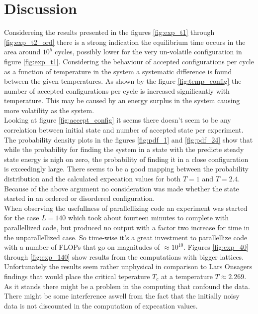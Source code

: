 \documentclass[12pt]{article}
\begin{document}
\section{Discussion}

Considereing the results presented in the figures \ref{fig:exp_t1} through \ref{fig:exp_t2_ord} there is a strong indication the  equilibrium time occurs in the area around $10^5$ cycles, possibly lower for the very un-volatile configuration in figure \ref{fig:exp_t1}. Considering the behaviour of accepted configurations per cycle as a function of temperature in the system a systematic difference is found between the given temperatures. As shown by the figure \ref{fig:temp_config} the number of accepted configurations per cycle is increased significantly with temperature. This may be caused by an energy surplus in the  system causing more volatility as the system. \\
 
\noindent Looking at figure \ref{fig:accept_config} it seems there doesn't seem to be any correlation between initial state and number of accepted state per experiment. \\

\noindent The probability density plots in the figures \ref{fig:pdf_1} and \ref{fig:pdf_24} show that while the probability for finding the system in a state with the predicte steady state energy is nigh on zero, the probability of finding it in a close configuration is exceedingly large. There seems to be a good mapping between the probability distribution and the calculated expecation values for both $T=1$ and $T = 2.4$. Because of the above argument no consideration was made whether the  state started in an ordered or disordered configuration.\\

\noindent When observing the usefullness of parallellizing code an experiment was started for the case $L = 140$ which took about fourteen minutes to complete with parallellized code, but produced no output with a factor two increase for time in the unparallellized case. So time-wise it's a great investment to parallellize code with a number of FLOPs that go on magnitudes of $\approx 10^{10}$. Figures \ref{fig:exp_40} through \ref{fig:exp_140} show results from the computations with bigger lattices. Unfortunately the results seem rather unphysical in comparison to Lars Onsagers findings that would place the critical teperature $T_c$ at a temperature $T \approx 2.269$. As it stands there might be a problem in the computing that confound the data. There might be some interference aswell from the fact that the initially noisy data is not discounted in the computation of expecation values.
\end{document}
